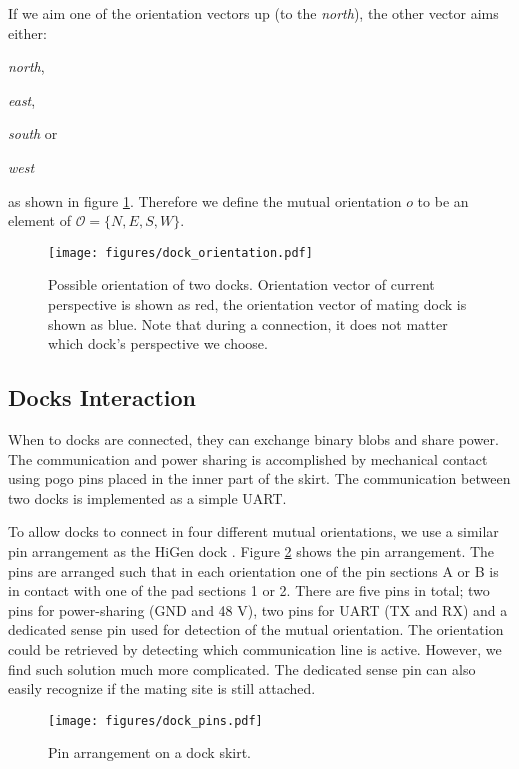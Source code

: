 If we aim one of the orientation vectors up (to the \emph{north}), the other
vector aims either:
\begin{enumerate*}
    \item \emph{north},
    \item \emph{east},
    \item \emph{south} or
    \item \emph{west}
\end{enumerate*}
as shown in figure \ref{fig:dock_orientation}. Therefore we define the mutual
orientation $o$ to be an element of $\mathcal{O} = \{N, E, S, W\}$.

\begin{figure}[!ht]
    \centering
    \texttt{[image: figures/dock\_orientation.pdf]}
    \caption{Possible orientation of two docks. Orientation vector of current
    perspective is shown as red, the orientation vector of mating dock is shown
    as blue. Note that during a connection, it does not matter which dock's
    perspective we choose.}
    \label{fig:dock_orientation}
\end{figure}


\subsection{Docks Interaction}\label{sec:dock_interaction}

When to docks are connected, they can exchange binary blobs and share power. The
communication and power sharing is accomplished by mechanical contact using pogo
pins placed in the inner part of the skirt. The communication between two docks
is implemented as a simple UART.

To allow docks to connect in four different mutual orientations, we use a
similar pin arrangement as the HiGen dock \cite{parrott_higen:_2014}. Figure
\ref{fig:dock_pins} shows the pin arrangement. The pins are arranged such that
in each orientation one of the pin sections A or B is in contact with one of the
pad sections 1 or 2. There are five pins in total; two pins for power-sharing
(GND and 48 V), two pins for UART (TX and RX) and a dedicated sense pin used for
detection of the mutual orientation. The orientation could be retrieved by
detecting which communication line is active. However, we find such solution
much more complicated. The dedicated sense pin can also easily recognize if the
mating site is still attached.

\begin{figure}[t]
    \centering
    \texttt{[image: figures/dock\_pins.pdf]}
    \caption{Pin arrangement on a dock skirt. }
    \label{fig:dock_pins}
\end{figure}

